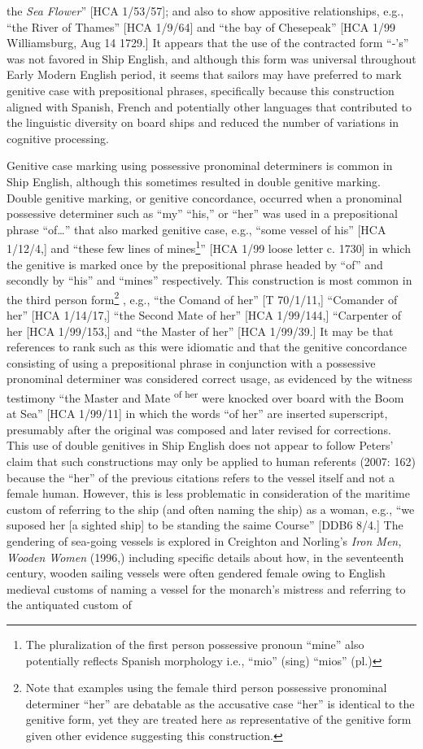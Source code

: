the \textit{Sea Flower}” [HCA 1/53/57]; and also to show appositive relationships, e.g., “the River of Thames” [HCA 1/9/64] and “the bay of Chesepeak” [HCA 1/99 Williamsburg, Aug 14 1729.] It appears that the use of the contracted form “-’s” was not favored in Ship English, and although this form was universal throughout Early Modern English period, it seems that sailors may have preferred to mark genitive case with prepositional phrases, specifically because this construction aligned with Spanish, French and potentially other languages that contributed to the linguistic diversity on board ships and reduced the number of variations in cognitive processing.

  Genitive case marking using possessive pronominal determiners is common in Ship English, although this sometimes resulted in double genitive marking. Double genitive marking, or genitive concordance, occurred when a pronominal possessive determiner such as “my” “his,” or “her” was used in a prepositional phrase “of…” that also marked genitive case, e.g., “some vessel of his” [HCA 1/12/4,] and “these few lines of mines\footnote{The pluralization of the first person possessive pronoun “mine” also potentially reflects Spanish morphology i.e., “mio” (sing) “mios” (pl.)}” [HCA 1/99 loose letter c. 1730] in which the genitive is marked once by the prepositional phrase headed by “of” and secondly by “his” and “mines” respectively. This construction is most common in the third person form\footnote{Note that examples using the female third person possessive pronominal determiner “her” are debatable as the accusative case “her” is identical to the genitive form, yet they are treated here as representative of the genitive form given other evidence suggesting this construction.} , e.g., “the Comand of her” [T 70/1/11,] “Comander of her” [HCA 1/14/17,] “the Second Mate of her” [HCA 1/99/144,] “Carpenter of her [HCA 1/99/153,] and “the Master of her” [HCA 1/99/39.] It may be that references to rank such as this were idiomatic and that the genitive concordance consisting of using a prepositional phrase in conjunction with a possessive pronominal determiner was considered correct usage, as evidenced by the witness testimony “the Master and Mate \textsuperscript{of her} were knocked over board with the Boom at Sea” [HCA 1/99/11] in which the words “of her” are inserted superscript, presumably after the original was composed and later revised for corrections.  This use of double genitives in Ship English does not appear to follow Peters’ claim that such constructions may only be applied to human referents (2007: 162) because the “her” of the previous citations refers to the vessel itself and not a female human. However, this is less problematic in consideration of the maritime custom of referring to the ship (and often naming the ship) as a woman, e.g., “we suposed her [a sighted ship] to be standing the saime Course” [DDB6 8/4.] The gendering of sea-going vessels is explored in Creighton and Norling’s \textit{Iron Men, Wooden Women} (1996,) including specific details about how, in the seventeenth century, wooden sailing vessels were often gendered female owing to English medieval customs of naming a vessel for the monarch’s mistress and referring to the antiquated custom of 
